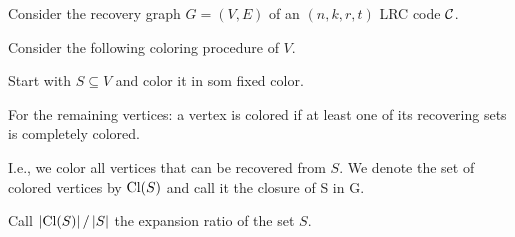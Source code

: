 \begin{frame}
    Consider the recovery graph $G = (V,E)$ of an $(n,k,r,t)$ LRC code $\mathcal{C}$.
    
    Consider the following coloring procedure of $V$.
    
    Start with $S \subseteq V$ and color it in som fixed color.
    
    For the remaining vertices: a vertex is colored if at least one of its recovering sets is completely colored.
    
    I.e., we color all vertices that can be recovered from $S$. We denote the set of colored vertices by $\text{Cl}(S)$ and call it the closure of S in G.
    
    Call $\left\vert {\text{Cl}(S)} \right\vert / \left\vert {S} \right\vert$ the expansion ratio of the set $S$.
    
    
\end{frame}